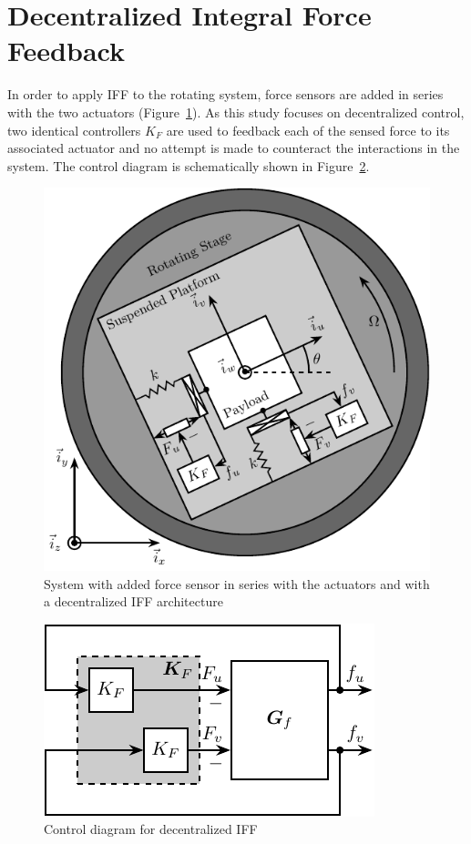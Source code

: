 \documentclass[10pt]{iopart}
\begin{document}
\section{Decentralized Integral Force Feedback}
\label{sec:orgdc87c6d}
\label{sec:iff}
In order to apply IFF to the rotating system, force sensors are added in series with the two actuators (Figure~\ref{fig:system_iff}).
As this study focuses on decentralized control, two identical controllers \(K_F\) are used to feedback each of the sensed force to its associated actuator and no attempt is made to counteract the interactions in the system.
The control diagram is schematically shown in Figure~\ref{fig:control_diagram_iff}.

\begin{figure}[htbp]
\centering
\includegraphics[scale=1,scale=0.9]{figs/fig04.pdf}
\caption{\label{fig:system_iff}System with added force sensor in series with the actuators and with a decentralized IFF architecture}
\end{figure}

\begin{figure}[htbp]
\centering
\includegraphics[scale=1,scale=1]{figs/fig05.pdf}
\caption{\label{fig:control_diagram_iff}Control diagram for decentralized IFF}
\end{figure}
\end{document}
